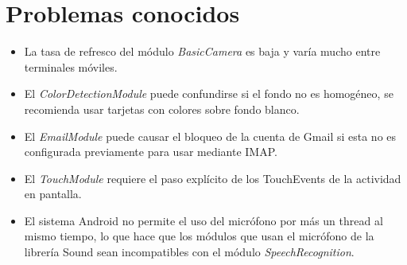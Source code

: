 \section{Problemas conocidos}
\begin{itemize}
	\item La tasa de refresco del módulo \textit{BasicCamera} es baja y varía mucho entre terminales móviles.
	\item El \textit{ColorDetectionModule} puede confundirse si el fondo no es homogéneo, se recomienda usar tarjetas con colores sobre fondo blanco.
	\item El \textit{EmailModule} puede causar el bloqueo de la cuenta de Gmail si esta no es configurada previamente para usar mediante IMAP.
	\item El \textit{TouchModule} requiere el paso explícito de los TouchEvents de la actividad en pantalla.
	\item El sistema Android no permite el uso del micrófono por más un thread al mismo tiempo, lo que hace que los módulos que usan el micrófono de la librería Sound sean incompatibles con el módulo \textit{SpeechRecognition}.
\end{itemize}
\label{sec:known_issues}
    

